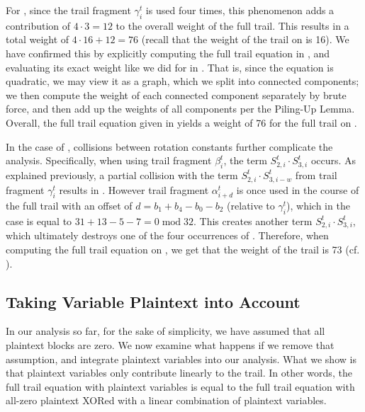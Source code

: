 For \MORUS[1280], since the trail fragment $\gamma^t_i$ is used four times, this phenomenon adds a contribution of $4 \cdot 3 = 12$ to the overall weight of the full trail. This results in a total weight of $4 \cdot 16 + 12 = 76$ (recall that the weight of the trail on \MiniMORUS[1280] is 16). We have confirmed this by explicitly computing the full trail equation in , and evaluating its exact weight like we did for \MiniMORUS in . That is, since the equation is quadratic, we may view it as a graph, which we split into connected components; we then compute the weight of each connected component separately by brute force, and then add up the weights of all components per the Piling-Up Lemma. Overall, the full trail equation given in  yields a weight of 76 for the full trail on \MORUS[1280].

In the case of \MORUS[640], collisions between rotation constants further complicate the analysis. Specifically, when using trail fragment $\beta^t_i$, the term $S^t_{2,i} \cdot S^t_{3,i}$ occurs. As explained previously, a partial collision with the term $S^t_{2,i} \cdot S^t_{3,i-w}$ from trail fragment $\gamma^t_i$ results in . However trail fragment $\alpha^t_{i+d}$ is once used in the course of the full trail with an offset of $d = b_1+b_4-b_0-b_2$ (relative to $\gamma^t_i$), which in the case \MORUS[640] is equal to $31+13-5-7 = 0 \;\text{mod}\; 32$. This creates another term $S^t_{2,i} \cdot S^t_{3,i}$, which ultimately destroys one of the four occurrences of . Therefore, when computing the full trail equation on \MORUS[640], we get that the weight of the trail is 73 (cf. ).


\subsection{Taking Variable Plaintext into Account}
\label{subsec:variable}

In our analysis so far, for the sake of simplicity, we have assumed that all plaintext blocks are zero. We now examine what happens if we remove that assumption, and integrate plaintext variables into our analysis. What we show is that plaintext variables only contribute linearly to the trail. In other words, the full trail equation with plaintext variables is equal to the full trail equation with all-zero plaintext XORed with a linear combination of plaintext variables.


